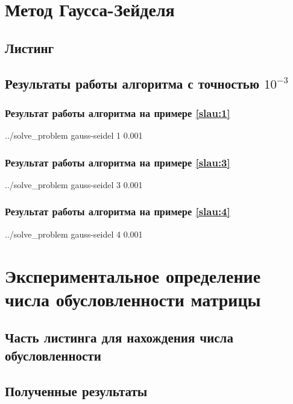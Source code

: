 \documentclass[a4paper]{article}
\begin{document}
\section{Метод Гаусса-Зейделя}

\subsection{Листинг}


\subsection{Результаты работы алгоритма с точностью $10^{-3}$}

\subsubsection{Результат работы алгоритма на примере \eqref{slau:1}}
\bash[stdout]
../solve_problem gauss-seidel 1 0.001
\END
\newline

\subsubsection{Результат работы алгоритма на примере \eqref{slau:3}}
\bash[stdout]
../solve_problem gauss-seidel 3 0.001
\END

\subsubsection{Результат работы алгоритма на примере \eqref{slau:4}}
\bash[stdout]
../solve_problem gauss-seidel 4 0.001
\END

\section{Экспериментальное определение числа обусловленности матрицы}

\subsection{Часть листинга для нахождения числа обусловленности}


\subsection{Полученные результаты}
\end{document}
